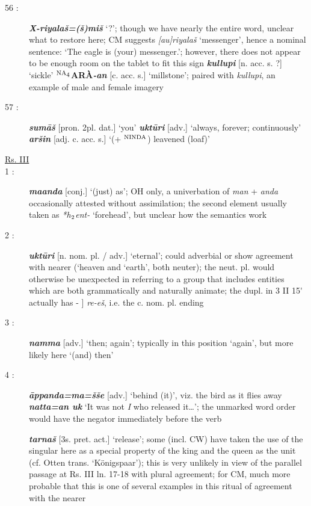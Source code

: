 \documentclass[10pt]{article}
\newcommand{\supersc}[1]{$^{\textrm{\scriptsize{#1}}}$}  	%
\newcommand{\subsc}[1]{$_{\textrm{\scriptsize{#1}}}$}	%
\newcommand{\bit}[1]{\textbf{\textit{#1}}}				%
\newcommand{\p}[1]{{\tiny[{#1}]}}					%
\newcommand{\hii}{h\subsc{2}}								%
\newcommand{\pr}{\'{ }}									%
\newcommand{\hith}{\textsubwedge{h}}
\newcommand{\stone}{\supersc{NA\subsc{4}}}
\renewcommand{\.}[1]{\textsubdot{#1}}
\begin{document}
\begin{description}
\item[56 :] \bit{X-riyala\v{s}=(\v{s})mi\v{s}} `?'; though we have nearly the entire word, unclear what to restore here; CM suggests \textit{[au]riyala\v{s}} `messenger', hence a nominal sentence: `The eagle is (your) messenger.'; however, there does not appear to be enough room on the tablet to fit this sign \bit{kullupi} \p{n. acc. s. ?} `sickle' \textbf{{\stone}AR\`A}\bit{-an} \p{c. acc. s.} `millstone'; paired with \textit{kullupi}, an example of male and female imagery

\item[57 :] \bit{sum\=a\v{s}} \p{pron. 2pl. dat.} `you' \bit{ukt\=uri} \p{adv.} `always, forever; continuously' \bit{{\hith}ar\v{s}in} \p{adj. c. acc. s.} `(+ \supersc{NINDA}) leavened (loaf)'

\item[\underline{Rs. III}]

\item[1 :] \bit{ma{\hith\hith}anda} \p{conj.} `(just) as'; OH only, a univerbation of \textit{man} + \textit{{\hith}anda} occasionally attested without assimilation; the second element usually taken as \textit{*{\hii}ent-} `forehead', but unclear how the semantics work

\item[2 :] \bit{ukt\=uri} \p{n. nom. pl. / adv.} `eternal'; could adverbial or show agreement with nearer (`heaven and `earth', both neuter); the neut. pl. would otherwise be unexpected in referring to a group that includes  entities which are both grammatically and naturally animate; the dupl. in 3 II 15{\pr} actually has - ] \textit{re-e\v{s}}, i.e. the c. nom. pl. ending

\item[3 :] \bit{namma} \p{adv.} `then; again'; typically in this position `again', but more likely here `(and) then'

\item[4 :] \bit{\=appanda=ma=\v{s}\v{s}e} \p{adv.} `behind (it)', viz. the bird as it flies away \bit{natta=an uk} `It was not \textit{I} who released it\ldots'; the unmarked word order would have the negator immediately before the verb

\bit{tarna\v{s}} \p{3s. pret. act.} `release'; some (incl. CW) have taken the use of the singular here as a special property of the king and the queen as the unit (cf. Otten trans. `K\"onigspaar'); this is very unlikely in view of the parallel passage at Rs. III ln. 17-18 with plural agreement; for CM, much more probable that this is one of several examples in this ritual of agreement with the nearer


\end{description}
\end{document}
